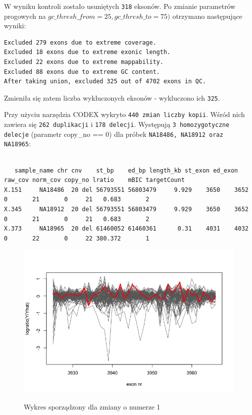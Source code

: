 \documentclass[a4paper]{article}
\begin{document}
W wyniku kontroli zostało usuniętych \texttt{318} eksonów.
Po zmianie parametrów progowych na $gc\_thresh\_from=25, gc\_thresh\_to=75)$ otrzymano następujące wyniki:

\begin{verbatim}
Excluded 279 exons due to extreme coverage.
Excluded 18 exons due to extreme exonic length.
Excluded 22 exons due to extreme mappability.
Excluded 88 exons due to extreme GC content.
After taking union, excluded 325 out of 4702 exons in QC.
\end{verbatim}

Zmieniła się zatem liczba wykluczonych eksonów - wykluczono ich \texttt{325}.

Przy użyciu narzędzia CODEX wykryto \texttt{440 zmian liczby kopii}. Wśród nich zawiera się \texttt{262 duplikacji} i \texttt{178 delecji}.
Występują \texttt{3 homozygotyczne delecje} (parametr copy\_no == 0) dla próbek \texttt{NA18486, NA18912 oraz NA18965}:
\footnotesize
\begin{verbatim}

   sample_name chr cnv    st_bp    ed_bp length_kb st_exon ed_exon raw_cov norm_cov copy_no lratio    mBIC targetCount
X.151     NA18486  20 del 56793551 56803479     9.929    3650    3652       0       21       0     21   0.683       2
X.345     NA18912  20 del 56793551 56803479     9.929    3650    3652       0       21       0     21   0.683       2
X.373     NA18965  20 del 61460052 61460361      0.31    4031    4032       0       22       0     22 380.372       1
\end{verbatim}
 \newpage
\begin{figure}[h]
    \centering
    \includegraphics[width=1.0\textwidth]{plot_change_no_1.png}
    \label{fig:igv}
    \caption[]{Wykres sporządzony dla zmiany o numerze 1}
\end{figure}
\end{document}
